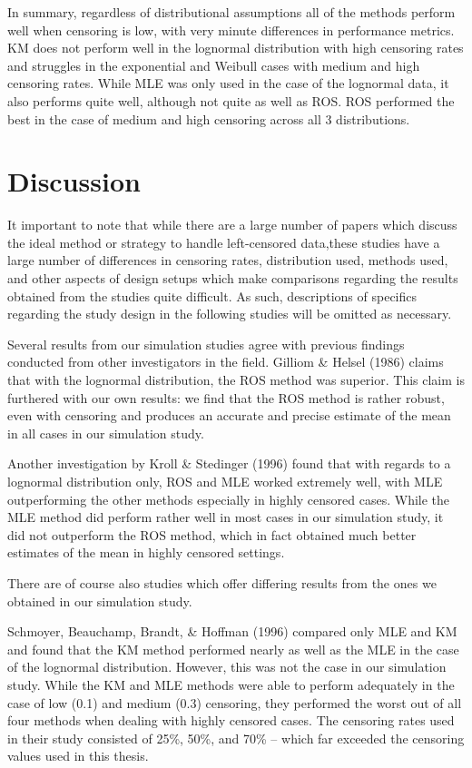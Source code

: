 \documentclass[12pt, twoside]{amherstthesis}
\begin{document}
In summary, regardless of distributional assumptions all of the methods perform well when censoring is low, with very minute differences in performance metrics. KM does not perform well in the lognormal distribution with high censoring rates and struggles in the exponential and Weibull cases with medium and high censoring rates. While MLE was only used in the case of the lognormal data, it also performs quite well, although not quite as well as ROS. ROS performed the best in the case of medium and high censoring across all 3 distributions.

\hypertarget{discussion}{%
\section{Discussion}\label{discussion}}

It important to note that while there are a large number of papers which discuss the ideal method or strategy to handle left-censored data,these studies have a large number of differences in censoring rates, distribution used, methods used, and other aspects of design setups which make comparisons regarding the results obtained from the studies quite difficult. As such, descriptions of specifics regarding the study design in the following studies will be omitted as necessary.

Several results from our simulation studies agree with previous findings conducted from other investigators in the field. Gilliom \& Helsel (1986) claims that with the lognormal distribution, the ROS method was superior. This claim is furthered with our own results: we find that the ROS method is rather robust, even with censoring and produces an accurate and precise estimate of the mean in all cases in our simulation study.

Another investigation by Kroll \& Stedinger (1996) found that with regards to a lognormal distribution only, ROS and MLE worked extremely well, with MLE outperforming the other methods especially in highly censored cases. While the MLE method did perform rather well in most cases in our simulation study, it did not outperform the ROS method, which in fact obtained much better estimates of the mean in highly censored settings.

There are of course also studies which offer differing results from the ones we obtained in our simulation study.

Schmoyer, Beauchamp, Brandt, \& Hoffman (1996) compared only MLE and KM and found that the KM method performed nearly as well as the MLE in the case of the lognormal distribution. However, this was not the case in our simulation study. While the KM and MLE methods were able to perform adequately in the case of low (0.1) and medium (0.3) censoring, they performed the worst out of all four methods when dealing with highly censored cases. The censoring rates used in their study consisted of 25\%, 50\%, and 70\% -- which far exceeded the censoring values used in this thesis.
\end{document}
